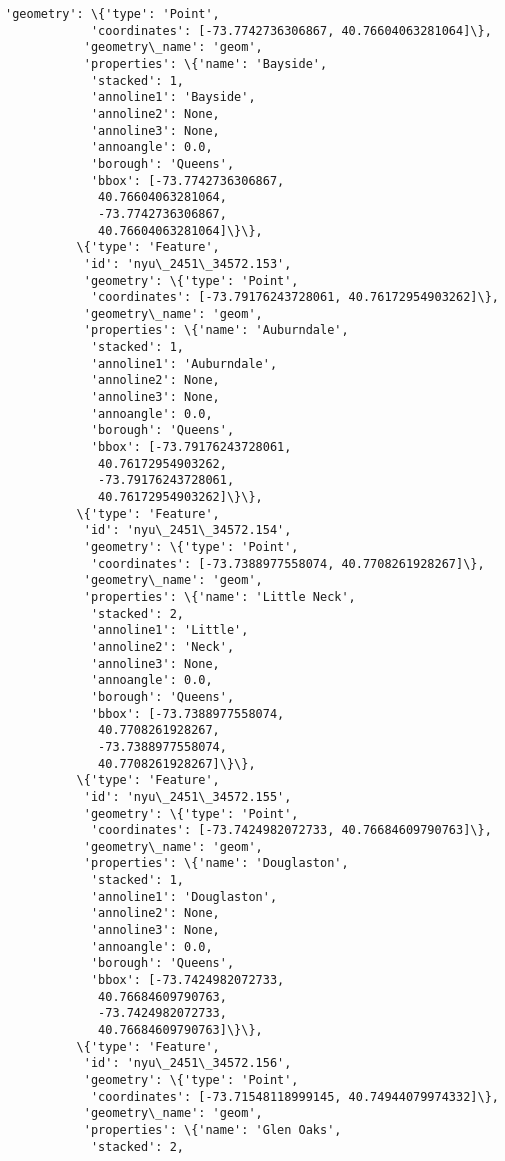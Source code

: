 \documentclass[11pt]{article}
\begin{document}
\begin{Verbatim}[commandchars=\\\{\}]
           'geometry': \{'type': 'Point',
            'coordinates': [-73.7742736306867, 40.76604063281064]\},
           'geometry\_name': 'geom',
           'properties': \{'name': 'Bayside',
            'stacked': 1,
            'annoline1': 'Bayside',
            'annoline2': None,
            'annoline3': None,
            'annoangle': 0.0,
            'borough': 'Queens',
            'bbox': [-73.7742736306867,
             40.76604063281064,
             -73.7742736306867,
             40.76604063281064]\}\},
          \{'type': 'Feature',
           'id': 'nyu\_2451\_34572.153',
           'geometry': \{'type': 'Point',
            'coordinates': [-73.79176243728061, 40.76172954903262]\},
           'geometry\_name': 'geom',
           'properties': \{'name': 'Auburndale',
            'stacked': 1,
            'annoline1': 'Auburndale',
            'annoline2': None,
            'annoline3': None,
            'annoangle': 0.0,
            'borough': 'Queens',
            'bbox': [-73.79176243728061,
             40.76172954903262,
             -73.79176243728061,
             40.76172954903262]\}\},
          \{'type': 'Feature',
           'id': 'nyu\_2451\_34572.154',
           'geometry': \{'type': 'Point',
            'coordinates': [-73.7388977558074, 40.7708261928267]\},
           'geometry\_name': 'geom',
           'properties': \{'name': 'Little Neck',
            'stacked': 2,
            'annoline1': 'Little',
            'annoline2': 'Neck',
            'annoline3': None,
            'annoangle': 0.0,
            'borough': 'Queens',
            'bbox': [-73.7388977558074,
             40.7708261928267,
             -73.7388977558074,
             40.7708261928267]\}\},
          \{'type': 'Feature',
           'id': 'nyu\_2451\_34572.155',
           'geometry': \{'type': 'Point',
            'coordinates': [-73.7424982072733, 40.76684609790763]\},
           'geometry\_name': 'geom',
           'properties': \{'name': 'Douglaston',
            'stacked': 1,
            'annoline1': 'Douglaston',
            'annoline2': None,
            'annoline3': None,
            'annoangle': 0.0,
            'borough': 'Queens',
            'bbox': [-73.7424982072733,
             40.76684609790763,
             -73.7424982072733,
             40.76684609790763]\}\},
          \{'type': 'Feature',
           'id': 'nyu\_2451\_34572.156',
           'geometry': \{'type': 'Point',
            'coordinates': [-73.71548118999145, 40.74944079974332]\},
           'geometry\_name': 'geom',
           'properties': \{'name': 'Glen Oaks',
            'stacked': 2,

\end{Verbatim}
\end{document}
